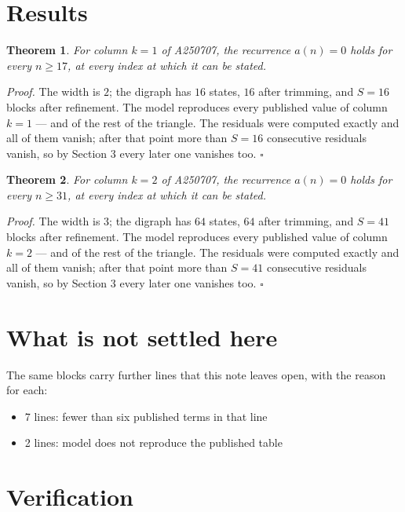 \documentclass[11pt]{article}
\newtheorem{theorem}{Theorem}
\theoremstyle{definition}
\begin{document}
\section{Results}

\begin{theorem} For column $k = 1$ of A250707, the recurrence $a(n) = 0$ holds for every $n \ge 17$, at every index at which it can be stated.\end{theorem}

{\itshape Proof.} The width is $2$; the digraph has $16$ states, $16$ after trimming, and $S = 16$ blocks after refinement. The model reproduces every published value of column $k = 1$ --- and of the rest of the triangle. The residuals were computed exactly and all of them vanish; after that point more than $S = 16$ consecutive residuals vanish, so by Section 3 every later one vanishes too. $\square$

\begin{theorem} For column $k = 2$ of A250707, the recurrence $a(n) = 0$ holds for every $n \ge 31$, at every index at which it can be stated.\end{theorem}

{\itshape Proof.} The width is $3$; the digraph has $64$ states, $64$ after trimming, and $S = 41$ blocks after refinement. The model reproduces every published value of column $k = 2$ --- and of the rest of the triangle. The residuals were computed exactly and all of them vanish; after that point more than $S = 41$ consecutive residuals vanish, so by Section 3 every later one vanishes too. $\square$

\section{What is not settled here}

The same blocks carry further lines that this note leaves open, with the reason for each:

\begin{itemize}

\item 7 lines: fewer than six published terms in that line

\item 2 lines: model does not reproduce the published table

\end{itemize}

\section{Verification}
\end{document}
